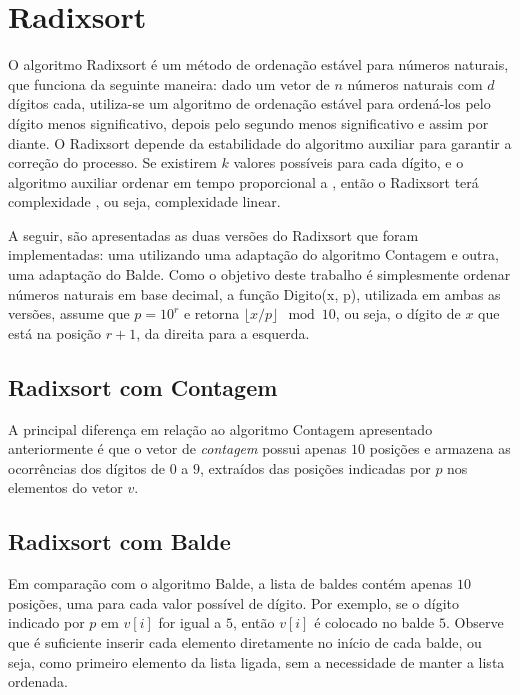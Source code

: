 \section{Radixsort}
O algoritmo Radixsort é um método de ordenação estável para números naturais, que funciona da seguinte maneira: dado um vetor de $n$ números naturais com $d$ dígitos cada, utiliza-se um algoritmo de ordenação estável para ordená-los pelo dígito menos significativo, depois pelo segundo menos significativo e assim por diante. O Radixsort depende da estabilidade do algoritmo auxiliar para garantir a correção do processo. Se existirem $k$ valores possíveis para cada dígito, e o algoritmo auxiliar ordenar em tempo proporcional a , então o Radixsort terá complexidade , ou seja, complexidade linear.

A seguir, são apresentadas as duas versões do Radixsort que foram implementadas: uma utilizando uma adaptação do algoritmo Contagem e outra, uma adaptação do Balde. Como o objetivo deste trabalho é simplesmente ordenar números naturais em base decimal, a função Digito(x, p), utilizada em ambas as versões, assume que $p = 10^r$ e retorna $\lfloor x / p \rfloor \mod 10$, ou seja, o dígito de $x$ que está na posição $r + 1$, da direita para a esquerda.

\subsection*{Radixsort com Contagem}
A principal diferença em relação ao algoritmo Contagem apresentado anteriormente é que o vetor de \textit{contagem} possui apenas $10$ posições e armazena as ocorrências dos dígitos de $0$ a $9$, extraídos das posições indicadas por $p$ nos elementos do vetor $v$.


\subsection*{Radixsort com Balde}
Em comparação com o algoritmo Balde, a lista de baldes contém apenas $10$ posições, uma para cada valor possível de dígito. Por exemplo, se o dígito indicado por $p$ em $v[i]$ for igual a $5$, então $v[i]$ é colocado no balde $5$. Observe que é suficiente inserir cada elemento diretamente no início de cada balde, ou seja, como primeiro elemento da lista ligada, sem a necessidade de manter a lista ordenada.

